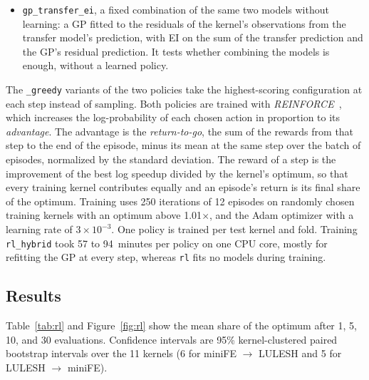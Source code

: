 \documentclass[10pt]{article}
\newcommand{\x}{\ensuremath{\times}}
\newcommand{\code}[1]{\texttt{#1}}
\begin{document}
\begin{itemize}
  evaluated. The transfer model here is fitted on the training kernels only,
  so its prediction does not change during the search, while the GP is refitted
  after every evaluation. When the policy is trained on a training kernel,
  that kernel's transfer predictions come from a model fitted on the other
  training kernels, so that the predictions seen during training are as
  inaccurate as those seen at test time. Without this nested fit, the policy
  would learn to trust predictions that are nearly exact on its training
  kernels. The model features are scaled by 5 and clipped to $\pm 10$.
\item \code{gp\_transfer\_ei}, a fixed combination of the same two models
  without learning: a GP fitted to the residuals of the kernel's observations
  from the transfer model's prediction, with EI on the sum of the transfer
  prediction and the GP's residual prediction. It tests whether combining the
  models is enough, without a learned policy.
\end{itemize}
The \code{\_greedy} variants of the two policies take the highest-scoring
configuration at each step instead of sampling. Both policies are trained
with \emph{REINFORCE}~\cite{williams1992reinforce}, which increases the
log-probability of each chosen action in proportion to its
\emph{advantage}. The advantage is the \emph{return-to-go}, the sum of the
rewards from that step to the end of the episode, minus its mean at the same
step over the batch of episodes, normalized by the standard deviation. The
reward of a step is the improvement of the best log speedup divided by the
kernel's optimum, so that every training kernel contributes equally and an
episode's return is its final share of the optimum. Training uses 250
iterations of 12 episodes on randomly chosen training kernels with an
optimum above 1.01\x{}, and the Adam optimizer with a learning rate of
$3 \times 10^{-3}$. One policy is trained per test kernel and fold. Training
\code{rl\_hybrid} took 57 to 94~minutes per policy on one CPU core, mostly
for refitting the GP at every step, whereas \code{rl} fits no models during
training.

\subsection{Results}
Table~\ref{tab:rl} and Figure~\ref{fig:rl} show the mean share of the optimum
after 1, 5, 10, and 30 evaluations. Confidence intervals are 95\%
kernel-clustered paired bootstrap intervals over the 11 kernels (6 for
miniFE $\to$ LULESH and 5 for LULESH $\to$ miniFE).
\end{document}
